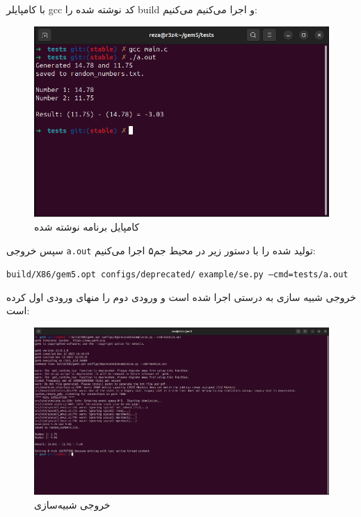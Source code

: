 \documentclass[12pt]{exam}
\begin{document}
\begin{multicols}{1}
با کامپایلر gcc کد نوشته شده را build و اجرا می‌کنیم می‌کنیم:
\begin{center}
	\begin{figure}[H]
		\includegraphics[scale=0.31]{images/img3.png}
		\caption{کامپایل برنامه نوشته شده}
		\label{کامپایل کد}
	\end{figure}
\end{center}

سپس خروجی \texttt{a.out} تولید شده را با دستور زیر در محیط جم‌۵ اجرا می‌کنیم:

\begin{latin}
	\texttt{build/X86/gem5.opt configs/deprecated/}
	\texttt{example/se.py --cmd=tests/a.out}
\end{latin} 

خروجی شبیه سازی به درستی اجرا شده است و ورودی دوم را منهای ورودی اول کرده است:

\begin{center}
	\begin{figure}[H]
		\includegraphics[scale=0.13]{images/img4.png}
		\caption{خروجی شبیه‌سازی}
		\label{شبیه‌سازی در جم}
	\end{figure}
\end{center}



\end{multicols}
\end{document}
